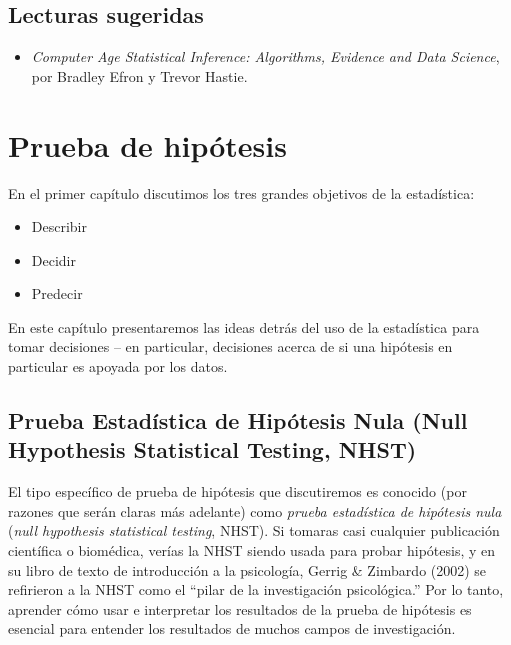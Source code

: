 \documentclass[
  12pt,
]{book}
\providecommand{\tightlist}{%
  \setlength{\itemsep}{0pt}\setlength{\parskip}{0pt}}
\begin{document}
\hypertarget{lecturas-sugeridas-5}{%
\section{Lecturas sugeridas}\label{lecturas-sugeridas-5}}

\begin{itemize}
\tightlist
\item
  \emph{Computer Age Statistical Inference: Algorithms, Evidence and Data Science}, por Bradley Efron y Trevor Hastie.
\end{itemize}

\hypertarget{hypothesis-testing}{%
\chapter{Prueba de hipótesis}\label{hypothesis-testing}}

En el primer capítulo discutimos los tres grandes objetivos de la estadística:

\begin{itemize}
\tightlist
\item
  Describir
\item
  Decidir
\item
  Predecir
\end{itemize}

En este capítulo presentaremos las ideas detrás del uso de la estadística para tomar decisiones -- en particular, decisiones acerca de si una hipótesis en particular es apoyada por los datos.

\hypertarget{prueba-estaduxedstica-de-hipuxf3tesis-nula-null-hypothesis-statistical-testing-nhst}{%
\section{Prueba Estadística de Hipótesis Nula (Null Hypothesis Statistical Testing, NHST)}\label{prueba-estaduxedstica-de-hipuxf3tesis-nula-null-hypothesis-statistical-testing-nhst}}

El tipo específico de prueba de hipótesis que discutiremos es conocido (por razones que serán claras más adelante) como \emph{prueba estadística de hipótesis nula} (\emph{null hypothesis statistical testing}, NHST). Si tomaras casi cualquier publicación científica o biomédica, verías la NHST siendo usada para probar hipótesis, y en su libro de texto de introducción a la psicología, Gerrig \& Zimbardo (2002) se refirieron a la NHST como el ``pilar de la investigación psicológica.'' Por lo tanto, aprender cómo usar e interpretar los resultados de la prueba de hipótesis es esencial para entender los resultados de muchos campos de investigación.
\end{document}
